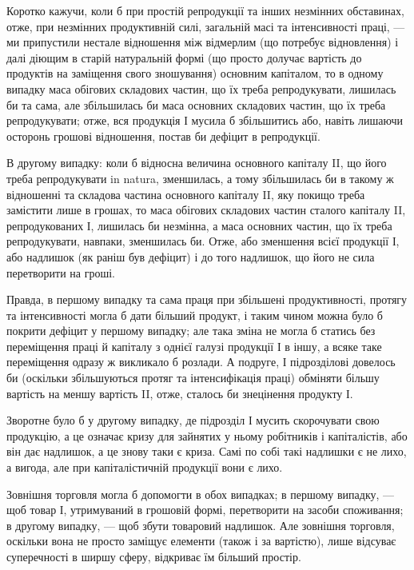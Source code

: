 
Коротко кажучи, коли б при простій репродукції та інших незмінних
обставинах, отже, при незмінних продуктивній силі, загальній масі та
інтенсивності праці, — ми припустили нестале відношення між відмерлим
(що потребує відновлення) і далі діющим в старій натуральній формі
(що просто долучає вартість до продуктів на заміщення свого зношування)
основним капіталом, то в одному випадку маса обігових складових частин,
що їх треба репродукувати, лишилась би та сама, але збільшилась би
маса основних складових частин, що їх треба репродукувати; отже, вся
продукція І мусила б збільшитись або, навіть лишаючи осторонь грошові
відношення, постав би дефіцит в репродукції.

В другому випадку: коли б відносна величина основного капіталу II,
що його треба репродукувати in natura, зменшилась, а тому збільшилась
би в такому ж відношенні та складова частина основного капіталу II,
яку покищо треба замістити лише в грошах, то маса обігових складових
частин сталого капіталу II, репродукованих І, лишилась би незмінна, а
маса основних частин, що їх треба репродукувати, навпаки, зменшилась
би. Отже, або зменшення всієї продукції І, або надлишок (як раніш був
дефіцит) і до того надлишок, що його не сила перетворити на гроші.

Правда, в першому випадку та сама праця при збільшені продуктивності,
протягу та інтенсивності могла б дати більший продукт, і таким
чином можна було б покрити дефіцит у першому випадку; але така
зміна не могла б статись без переміщення праці й капіталу з однієї галузі
продукції І в іншу, а всяке таке переміщення одразу ж викликало б
розлади. А подруге, І підрозділові довелось би (оскільки збільшуються
протяг та інтенсифікація праці) обміняти більшу вартість на
меншу вартість II, отже, сталось би знецінення продукту І.

Зворотне було б у другому випадку, де підрозділ І мусить скорочувати
свою продукцію, а це означає кризу для зайнятих у ньому робітників
і капіталістів, або він дає надлишок, а це знову таки є криза.
Самі по собі такі надлишки є не лихо, а вигода, але при капіталістичній
продукції вони є лихо.

Зовнішня торговля могла б допомогти в обох випадках; в першому
випадку, — щоб товар І, утримуваний в грошовій формі, перетворити на
засоби споживання; в другому випадку, — щоб збути товаровий надлишок.
Але зовнішня торговля, оскільки вона не просто заміщує елементи (також
і за вартістю), лише відсуває суперечності в ширшу сферу, відкриває їм
більший простір.

